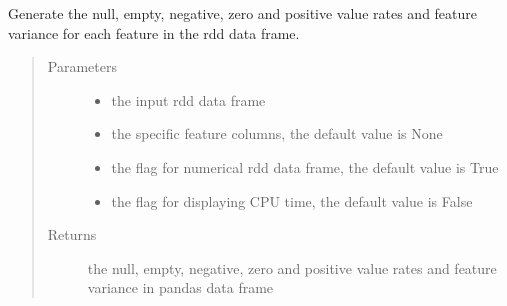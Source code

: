 \documentclass[letterpaper,12pt,english]{sphinxmanual}
\begin{document}
\begin{fulllineitems}
Generate the null, empty, negative, zero and  positive value rates and feature variance for
each feature in the rdd data frame.
\begin{quote}\begin{description}
\item[{Parameters}] \leavevmode\begin{itemize}
\item {} 
 \textendash{} the input rdd data frame

\item {} 
 \textendash{} the specific feature columns, the default value is None

\item {} 
 \textendash{} the flag for numerical rdd data frame, the default value is True

\item {} 
 \textendash{} the flag for displaying CPU time, the default value is False

\end{itemize}

\item[{Returns}] \leavevmode
the null, empty, negative, zero and  positive value rates and feature variance
in pandas data frame

\end{description}\end{quote}


\end{fulllineitems}
\end{document}
